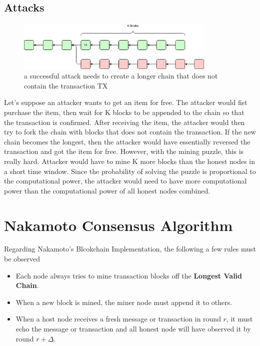 \documentclass[twoside]{article}
\begin{document}
\subsection{Attacks}
\begin{figure}[htbp]
	\label{fig:blockchain}
	\centering
	\includegraphics[width=0.85\textwidth]{attack2.png}
	\caption{a successful attack needs to create a longer chain that does not contain the transaction TX}
\end{figure}

Let's suppose an attacker wants to get an item for free. The attacker would fist purchase the item, then wait for K blocks to be appended to the chain so that the transaction is confirmed. After receiving the item, the attacker would then try to fork the chain with blocks that does not contain the transaction. If the new chain becomes the longest, then the attacker would have essentially reversed the transaction and got the item for free. However, with the mining puzzle, this is really hard. Attacker would have to mine K more blocks than the honest nodes in a short time window. Since the probability of solving the puzzle is proportional to the computational power, the attacker would need to have more computational power than the computational power of all honest nodes combined.


\section{Nakamoto Consensus Algorithm}
Regarding Nakamoto's Blcokchain Implementation, the following a few rules must be observed
\begin{itemize}
    \item Each node always tries to mine transaction blocks off the \textbf{Longest Valid Chain}.
    \item When a new block is mined, the miner node must append it to others.
    \item When a host node receives a fresh message or transaction in round $r$, it must echo the message or transaction and all honest node will have observed it by round $r + \Delta$.
\end{itemize}
\end{document}
